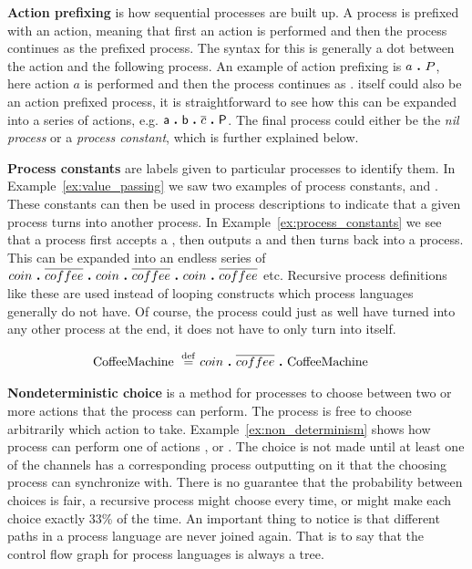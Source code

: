 	\textbf{Action prefixing} is how sequential processes are built up. A 
	process is prefixed with an action, meaning that first an action is 
	performed and then the process continues as the prefixed process. The syntax
	for this is generally a dot between the action and the following process. An 
	example of action prefixing is $a \ \textbf{.}\  P$, here action $a$ is performed
	and then the process continues as .  itself could also be an
	action prefixed process, it is straightforward to see how this can be
	expanded into a series of actions, e.g. 
	$\textsf{a} \ \textbf{.}\  \textsf{b} \ \textbf{.}\  \overline{c} \ \textbf{.}\  \textsf{P}$. The 
	final process  could either be the \textit{nil process} or a
	\textit{process constant}, which is further explained below.

	\textbf{Process constants} are labels given to particular processes to 
	identify them. In Example~\ref{ex:value_passing} we saw two examples of 
	process constants,  and . These constants can 
	then be used in process descriptions to indicate that a given process turns 
	into another process. In Example~\ref{ex:process_constants} we see that a 
	 process first accepts a , then outputs a 
	 and then turns back into a  process. 
	This can be expanded into an endless series of 
	$coin \ \textbf{.}\  \overline{coffee} \ \textbf{.}\  coin \ \textbf{.}\  \overline{coffee} \ \textbf{.}\  coin \ \textbf{.}\  \overline{coffee}$ 
	etc. Recursive process definitions like these are used instead of looping 
	constructs which process languages generally do not have.  Of course, the 
	 process could just as well have turned into any other 
	process at the end, it does not have to only turn into itself.
	
	\begin{Exa}\label{ex:process_constants}
	\begin{align*}
			\mathrm{CoffeeMachine} \ \stackrel{\mathrm{def}}{=}\  & coin \ \textbf{.}\  \overline{coffee} \ \textbf{.}\  \mathrm{CoffeeMachine} 
	\end{align*}	
	\end{Exa}

	\textbf{Nondeterministic choice} is a method for processes to choose between 
	two or more actions that the process can perform. The process is free to 
	choose arbitrarily which action to take. Example~\ref{ex:non_determinism} 
	shows how process  can perform one of actions , 
	 or . The choice is not made until at least one of the 
	channels has a corresponding process outputting on it that the choosing 
	process can synchronize with. There is no guarantee that the probability 
	between choices is fair, a recursive process might choose  every
	time, or might make each choice exactly 33\% of the time. An important thing 
	to notice is that different paths in a process language are never joined 
	again. That is to say that the control flow graph for process languages is 
	always a tree.
		
